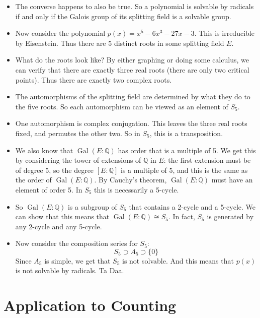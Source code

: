\documentclass[12pt]{article}
\theoremstyle{plain}
\theoremstyle{definition}
\theoremstyle{remark}
\def\Q{\mathbb Q}
\DeclareMathOperator{\Gal}{Gal}
\newcommand{\todayis}[1]{\clearpage{\rhead{\footnotesize #1}}}
\begin{document}
\begin{itemize}
\item The converse happens to also be true.  So a polynomial is solvable by radicals if and only if the Galois group of its splitting field is a solvable group.

\item Now consider the polynomial $p(x) = x^5 - 6x^3 - 27x - 3$.  This is irreducible by Eisenstein.  Thus there are 5 distinct roots in some splitting field $E$.

\item What do the roots look like?  By either graphing or doing some calculus, we can verify that there are exactly three real roots (there are only two critical points).  Thus there are exactly two complex roots.

\item The automorphisms of the splitting field are determined by what they do to the five roots.  So each automorphism can be viewed as an element of $S_5$.  

\item One automorphism is complex conjugation.  This leaves the three real roots fixed, and permutes the other two.  So in $S_5$, this is a transposition.

\item We also know that $\Gal(E:\Q)$ has order that is a multiple of 5.  We get this by considering the tower of extensions of $\Q$ in $E$: the first extension must be of degree 5, so the degree $[E:\Q]$ is a multiple of 5, and this is the same as the order of $\Gal(E:\Q)$.  By Cauchy's theorem, $\Gal(E:\Q)$ must have an element of order 5.  In $S_5$ this is necessarily a 5-cycle.

\item So $\Gal(E:\Q)$ is a subgroup of $S_5$ that contains a 2-cycle and a 5-cycle.  We can show that this means that $\Gal(E:\Q) \cong S_5$.  In fact, $S_5$ is generated by any 2-cycle and any 5-cycle.  

\item Now consider the composition series for $S_5$:
\[S_5 \supset A_5 \supset \{0\}\]
Since $A_5$ is simple, we get that $S_5$ is not solvable.  And this means that $p(x)$ is not solvable by radicals.  Ta Daa.


\end{itemize}

\todayis{Monday, April 8}

\section*{Application to Counting}
\end{document}
